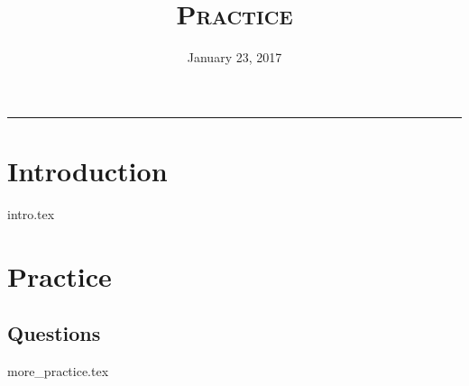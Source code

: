 \documentclass{exam}
\title{\textsc{Practice}}
\date{January 23, 2017}
\begin{document}
\maketitle
\rule{\textwidth}{0.15em}
\fontsize{12}{15}\selectfont
\thispagestyle{empty}

\section{Introduction}
{intro.tex}
\section{Practice}
\subsection{Questions}
\begin{questions}
{more_practice.tex}
\end{questions}
\end{document}
